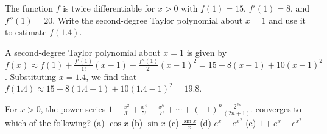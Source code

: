 \begin{Exercise} The function $f$ is twice 
differentiable for $x > 0$ with $f(1) = 15$, $f'(1) = 8$, and $f''(1) = 20$. 
Write the second-degree Taylor polynomial about $x = 1$ and use it to 
estimate $f(1.4)$.
\end{Exercise}

\begin{Answer}
A second-degree Taylor polynomial about $x = 1$ is given by $f(x) \approx f(1) 
+ \frac{f'(1)}{1!}(x - 1) + \frac{f''(1)}{2!}(x - 1)^2 = 15 + 8(x - 1) + 10(x 
- 1)^2$. Substituting $x = 1.4$, we find that $f(1.4) \approx 15 + 8(1.4 - 1) 
+ 10(1.4 - 1)^2 = 19.8$.
\end{Answer}

\begin{Exercise} For $x > 0$, the power series $1 - 
\frac{x^2}{3!} + \frac{x^4}{5!} - \frac{x^6}{7!} + \cdots + (-1)^n \frac{2^{2n
}}{(2n + 1)!}$ converges to which of the following?
(a) $\cos{x}$
(b) $\sin{x}$
(c) $\frac{\sin{x}}{x}$
(d) $e^x - e^{x^2}$
(e) $1 + e^x - e^{x^2}$
\end{Exercise}

\begin{Answer}
(C). Since $\sin{x} = \sum_{n=0}^\infty (-1)^n \frac{x^{2n + 1}}{(2n + 1)!}$, 
then $\frac{\sin{x}}{x}} = \sum_{n = 0}^\infty (-1)^n \frac{x^{2n + 1}}{x(2n+1
)!} = \sum_{n=0}^\infty (-1)^n \frac{2^{2n}}{(2n + 1)!}$.
\end{Answer}


